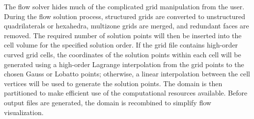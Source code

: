 
The flow solver hides much of the complicated grid manipulation from the user.
%
During the flow solution process, structured grids are converted to unstructured
quadrilaterals or hexahedra, multizone grids are merged, and redundant faces are
removed.
%
The required number of solution points will then be inserted into the cell
volume for the specified solution order.
%
If the grid file contains high-order curved grid cells, the coordinates of the
solution points within each cell will be generated using a high-order Lagrange
interpolation from the grid points to the chosen Gauss or Lobatto points;
otherwise, a linear interpolation between the cell vertices will be used to
generate the solution points.
%
The domain is then partitioned to make efficient use of the computational
resources available.
%
Before output files are generated, the domain is recombined to simplify flow
visualization.




